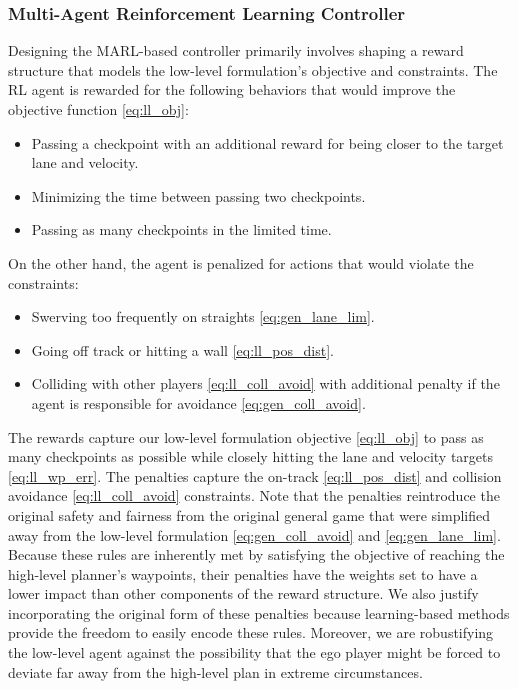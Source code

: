 \subsubsection{Multi-Agent Reinforcement Learning Controller}
Designing the MARL-based controller primarily involves shaping a reward structure that models the low-level formulation's objective and constraints. The RL agent is rewarded for the following behaviors that would improve the objective function \eqref{eq:ll_obj}:
\begin{itemize}
    \item Passing a checkpoint with an additional reward for being closer to the target lane and velocity.
    \item Minimizing the time between passing two checkpoints.
    \item Passing as many checkpoints in the limited time.
\end{itemize}
On the other hand, the agent is penalized for actions that would violate the constraints:
\begin{itemize}
    \item Swerving too frequently on straights \eqref{eq:gen_lane_lim}.
    \item Going off track or hitting a wall \eqref{eq:ll_pos_dist}.
    \item Colliding with other players \eqref{eq:ll_coll_avoid} with additional penalty if the agent is responsible for avoidance \eqref{eq:gen_coll_avoid}. 
\end{itemize}

The rewards capture our low-level formulation objective \eqref{eq:ll_obj} to pass as many checkpoints as possible while closely hitting the lane and velocity targets \eqref{eq:ll_wp_err}. The penalties capture the on-track \eqref{eq:ll_pos_dist} and collision avoidance \eqref{eq:ll_coll_avoid} constraints. Note that the penalties reintroduce the original safety and fairness from the original general game that were simplified away from the low-level formulation \eqref{eq:gen_coll_avoid} and \eqref{eq:gen_lane_lim}. Because these rules are inherently met by satisfying the objective of reaching the high-level planner's waypoints, their penalties have the weights set to have a lower impact than other components of the reward structure. We also justify incorporating the original form of these penalties because learning-based methods provide the freedom to easily encode these rules. Moreover, we are robustifying the low-level agent against the possibility that the ego player might be forced to deviate far away from the high-level plan in extreme circumstances.

